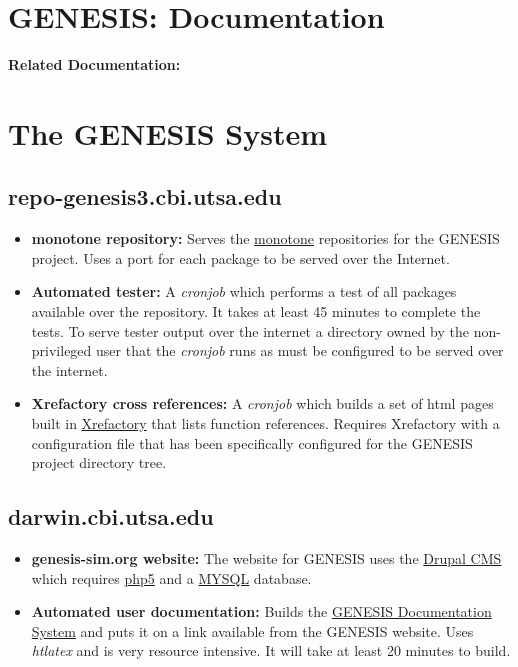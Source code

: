 \documentclass[12pt]{article}
\begin{document}
\section*{GENESIS: Documentation}

{\bf Related Documentation:}

\section*{The GENESIS System}

\subsection*{\bf repo-genesis3.cbi.utsa.edu}

\begin{itemize}

\item {\bf monotone repository:} Serves the \href{http://www.monotone.ca/}{monotone} repositories for the GENESIS project. Uses a port for each package to be served over the Internet.

\item {\bf Automated tester:} A {\it cronjob} which performs a test of all packages available over the repository.  It takes at least 45 minutes to complete the tests. To serve tester output over the internet a directory owned by the non-privileged user that the {\it cronjob} runs as must be configured to be served over the internet. 

\item {\bf Xrefactory cross references:} A {\it cronjob} which builds a set of html pages built in \href{http://www.xref-tech.com/xrefactory/main.html}{Xrefactory} that lists function references.  Requires Xrefactory with a configuration file that has been specifically configured for the GENESIS project directory tree. 

\end{itemize}

\subsection*{\bf darwin.cbi.utsa.edu}

\begin{itemize}

\item {\bf genesis-sim.org website:} The website for GENESIS uses the \href{http://drupal.org/}{Drupal CMS} which requires \href{http://www.php.net/}{php5} and a \href{http://www.mysql.com/}{MYSQL} database.

\item {\bf Automated user documentation:} Builds the \href{../documentation-overview/documentation-overview.tex}{GENESIS Documentation System} and puts it on a link available from the GENESIS website.  Uses {\it htlatex} and is very resource intensive.  It will take at least 20 minutes to build.

\end{itemize}
\end{document}
